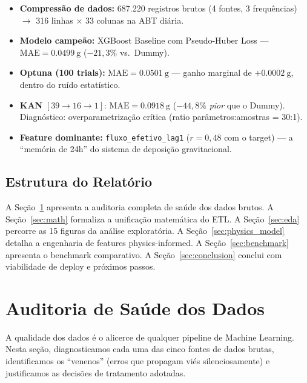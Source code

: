 \documentclass[12pt, a4paper]{article}
\newcommand{\feature}[1]{\texttt{#1}}
\newcommand{\abt}{ABT}
\newcommand{\mae}{\text{MAE}}
\begin{document}
\begin{itemize}[noitemsep]
    \item \textbf{Compressão de dados:} 687.220 registros brutos (4 fontes,
          3 frequências) $\rightarrow$ 316 linhas $\times$ 33 colunas na
          \abt{} diária.
    \item \textbf{Modelo campeão:} XGBoost Baseline com Pseudo-Huber Loss —
          $\mae = \SI{0,0499}{\gram}$ ($-21{,}3\%$ vs.\ Dummy).
    \item \textbf{Optuna (100 trials):} $\mae = \SI{0,0501}{\gram}$ — ganho
          marginal de $+\SI{0,0002}{\gram}$, dentro do ruído estatístico.
    \item \textbf{KAN} $[39 \to 16 \to 1]$: $\mae = \SI{0,0918}{\gram}$
          ($-44{,}8\%$ \textit{pior} que o Dummy). Diagnóstico:
          overparametrização crítica (ratio parâmetros:amostras = 30:1).
    \item \textbf{Feature dominante:} \feature{fluxo\_efetivo\_lag1}
          ($r = 0{,}48$ com o target) — a ``memória de 24h'' do sistema
          de deposição gravitacional.
\end{itemize}

\subsection{Estrutura do Relatório}

A Seção~\ref{sec:data_audit} apresenta a auditoria completa de saúde dos
dados brutos. A Seção~\ref{sec:math} formaliza a unificação matemática do
ETL. A Seção~\ref{sec:eda} percorre as 15 figuras da análise exploratória.
A Seção~\ref{sec:physics_model} detalha a engenharia de features
physics-informed. A Seção~\ref{sec:benchmark} apresenta o benchmark
comparativo. A Seção~\ref{sec:conclusion} conclui com viabilidade de deploy
e próximos passos.

\newpage
\section{Auditoria de Saúde dos Dados}
\label{sec:data_audit}

A qualidade dos dados é o alicerce de qualquer pipeline de Machine Learning.
Nesta seção, diagnosticamos cada uma das cinco fontes de dados brutas,
identificamos os ``venenos'' (erros que propagam viés silenciosamente) e
justificamos as decisões de tratamento adotadas.
\end{document}
